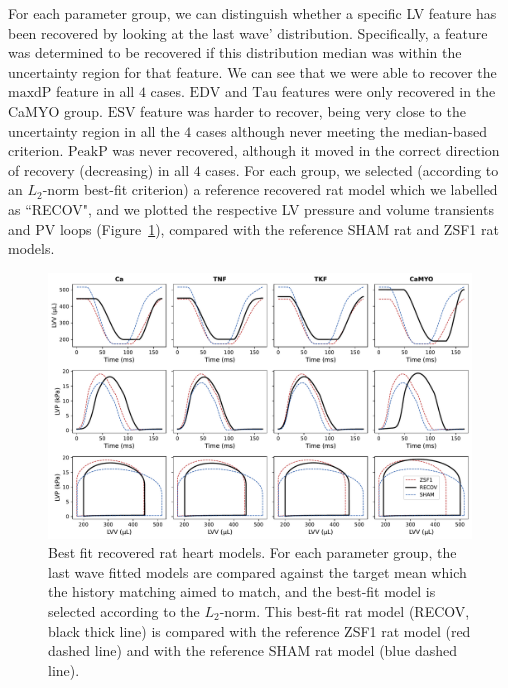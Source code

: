 \vspace{0.2cm}
For each parameter group, we can distinguish whether a specific LV feature has been recovered by looking at the last wave' distribution. Specifically, a feature was determined to be recovered if this distribution median was within the uncertainty region for that feature. We can see that we were able to recover the $\textrm{maxdP}$ feature in all $4$ cases. $\textrm{EDV}$ and $\textrm{Tau}$ features were only recovered in the CaMYO group. $\textrm{ESV}$ feature was harder to recover, being very close to the uncertainty region in all the $4$ cases although never meeting the median-based criterion. $\textrm{PeakP}$ was never recovered, although it moved in the correct direction of recovery (decreasing) in all $4$ cases. For each group, we selected (according to an $L_2$-norm best-fit criterion) a reference recovered rat model which we labelled as ``RECOV", and we plotted the respective LV pressure and volume transients and PV loops (Figure~\ref{fig:bestfits}), compared with the reference SHAM rat and ZSF1 rat models.

\begin{figure}[!ht]
    \myfloatalign
    \includegraphics[width=\textwidth]{figures/chapter07/Fig_7.pdf}
    \caption{Best fit recovered rat heart models. For each parameter group, the last wave fitted models are compared against the target mean which the history matching aimed to match, and the best-fit model is selected according to the $L_2$-norm. This best-fit rat model (RECOV, black thick line) is compared with the reference ZSF1 rat model (red dashed line) and with the reference SHAM rat model (blue dashed line).}
    \label{fig:bestfits}
\end{figure}

